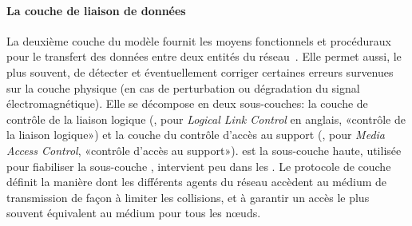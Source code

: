             \paragraph{La couche de liaison de données}\label{st:ssec:mac}
La deuxième couche du modèle fournit les moyens fonctionnels et procéduraux pour le transfert des données entre deux entités du réseau~\cite{TW10}.
Elle permet aussi, le plus souvent, de détecter et éventuellement corriger certaines erreurs survenues sur la couche physique (en cas de perturbation ou dégradation du signal électromagnétique).
Elle se décompose en deux sous-couches: la couche de contrôle de la liaison logique (\llc, pour \textit{Logical Link Control} en anglais, «contrôle de la liaison logique») et la couche du contrôle d'accès au support (\mac, pour \textit{Media Access Control}, «contrôle d'accès au support»).
\llc est la sous-couche haute, utilisée pour fiabiliser la sous-couche \mac, intervient peu dans les \rcs.
Le protocole de couche \mac définit la manière dont les différents agents du réseau accèdent au médium de transmission de façon à limiter les collisions, et à garantir un accès le plus souvent équivalent au médium pour tous les nœuds.
